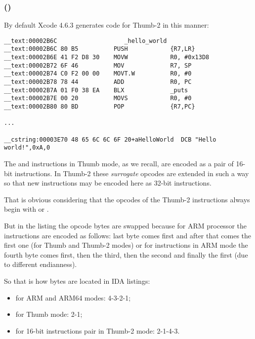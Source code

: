 \subsubsection{\OptimizingXcodeIV (\ThumbTwoMode)}

By default Xcode 4.6.3 generates code for Thumb-2 in this manner:

\begin{lstlisting}[caption=\OptimizingXcodeIV (\ThumbTwoMode),style=customasmARM]
__text:00002B6C                   _hello_world
__text:00002B6C 80 B5          PUSH            {R7,LR}
__text:00002B6E 41 F2 D8 30    MOVW            R0, #0x13D8
__text:00002B72 6F 46          MOV             R7, SP
__text:00002B74 C0 F2 00 00    MOVT.W          R0, #0
__text:00002B78 78 44          ADD             R0, PC
__text:00002B7A 01 F0 38 EA    BLX             _puts
__text:00002B7E 00 20          MOVS            R0, #0
__text:00002B80 80 BD          POP             {R7,PC}

...

__cstring:00003E70 48 65 6C 6C 6F 20+aHelloWorld  DCB "Hello world!",0xA,0
\end{lstlisting}


\myindex{\ThumbTwoMode}

The  and  instructions in Thumb mode, as we recall, are encoded as a pair of 16-bit instructions.
In Thumb-2 these \emph{surrogate} opcodes are extended in such a way so that new instructions may be encoded here as 32-bit instructions.

That is obvious considering that the opcodes of the Thumb-2 instructions always begin with  or .

But in the \IDA listing
the opcode bytes are swapped because for ARM processor the instructions are encoded as follows: 
last byte comes first and after that comes the first one (for Thumb and Thumb-2 modes) 
or for instructions in ARM mode the fourth byte comes first, then the third,
then the second and finally the first (due to different \gls{endianness}).

So that is how bytes are located in IDA listings:
\begin{itemize}
\item for ARM and ARM64 modes: 4-3-2-1;
\item for Thumb mode: 2-1;
\item for 16-bit instructions pair in Thumb-2 mode: 2-1-4-3.
\end{itemize}

